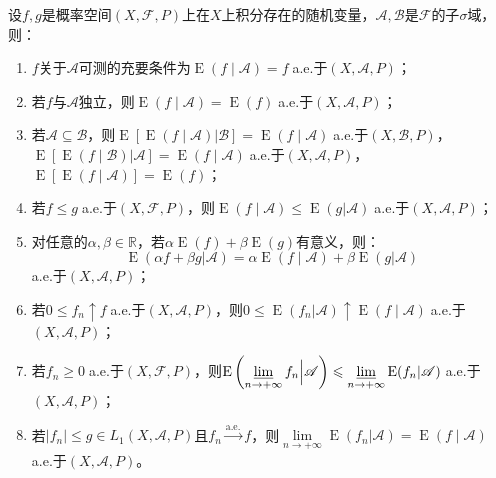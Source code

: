 \begin{property}\label{prop:ConditionalExpectation}
	设$f,g$是概率空间$(X,\mathscr{F},P)$上在$X$上积分存在的随机变量，$\mathscr{A},\mathscr{B}$是$\mathscr{F}$的子$\sigma$域，则：
	\begin{enumerate}
		\item $f$关于$\mathscr{A}$可测的充要条件为$\operatorname{E}(f\mid\mathscr{A})=f\;$a.e.于$(X,\mathscr{A},P)$；
		\item 若$f$与$\mathscr{A}$独立，则$\operatorname{E}(f\mid\mathscr{A})=\operatorname{E}(f)\;$a.e.于$(X,\mathscr{A},P)$；
		\item 若$\mathscr{A}\subseteq\mathscr{B}$，则$\operatorname{E}[\operatorname{E}(f\mid\mathscr{A})|\mathscr{B}]=\operatorname{E}(f\mid\mathscr{A})\;$a.e.于$(X,\mathscr{B},P)$，$\operatorname{E}[\operatorname{E}(f\mid\mathscr{B})|\mathscr{A}]=\operatorname{E}(f\mid\mathscr{A})\;$a.e.于$(X,\mathscr{A},P)$，$\operatorname{E}[\operatorname{E}(f\mid\mathscr{A})]=\operatorname{E}(f)$；
		\item 若$f\leqslant g\;$a.e.于$(X,\mathscr{F},P)$，则$\operatorname{E}(f\mid\mathscr{A})\leqslant\operatorname{E}(g|\mathscr{A})\;$a.e.于$(X,\mathscr{A},P)$；
		\item 对任意的$\alpha,\beta\in\mathbb{R}$，若$\alpha\operatorname{E}(f)+\beta\operatorname{E}(g)$有意义，则：
		\begin{equation*}
			\operatorname{E}(\alpha f+\beta g|\mathscr{A})=\alpha\operatorname{E}(f\mid\mathscr{A})+	\beta\operatorname{E}(g|\mathscr{A})
		\end{equation*}
		a.e.于$(X,\mathscr{A},P)$；
		\item 若$0\leqslant f_n\uparrow f\;$a.e.于$(X,\mathscr{A},P)$，则$0\leqslant\operatorname{E}(f_n|\mathscr{A})\uparrow \operatorname{E}(f\mid\mathscr{A})\;$a.e.于$(X,\mathscr{A},P)$；
		\item 若$f_n\geqslant0\;$a.e.于$(X,\mathscr{F},P)$，则$\operatorname{E}\left(\varliminf\limits_{n\to+\infty}f_n\Big|\mathscr{A}\right)\leqslant\varliminf\limits_{n\to+\infty}\operatorname{E}(f_n|\mathscr{A})\;$a.e.于$(X,\mathscr{A},P)$；
		\item 若$|f_n|\leqslant g\in L_1(X,\mathscr{A},P)$且$f_n\overset{\text{a.e.}}{\longrightarrow}f$，则$\lim\limits_{n\to+\infty}\operatorname{E}(f_n|\mathscr{A})=\operatorname{E}(f\mid\mathscr{A})\;$a.e.于$(X,\mathscr{A},P)$。
	\end{enumerate}
\end{property}
